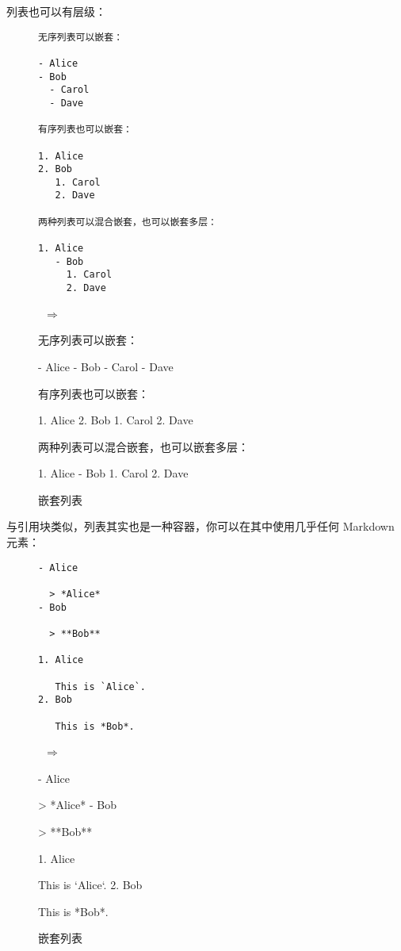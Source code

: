 \documentclass[a4paper,fontset=none]{ctexart}
\begin{document}
列表也可以有层级：

\begin{figure}[H]
    \centering
    \begin{minipage}{0.45\textwidth}
        \begin{verbatim}
无序列表可以嵌套：

- Alice
- Bob
  - Carol
  - Dave

有序列表也可以嵌套：

1. Alice
2. Bob
   1. Carol
   2. Dave

两种列表可以混合嵌套，也可以嵌套多层：

1. Alice
   - Bob
     1. Carol
     2. Dave
        \end{verbatim}
    \end{minipage}
    \, $\Longrightarrow$ \,
    \begin{minipage}{0.45\textwidth}
\begin{markdown}
无序列表可以嵌套：

- Alice
- Bob
  - Carol
  - Dave

有序列表也可以嵌套：

1. Alice
2. Bob
   1. Carol
   2. Dave

两种列表可以混合嵌套，也可以嵌套多层：

1. Alice
   - Bob
     1. Carol
     2. Dave
\end{markdown}
    \end{minipage}
    \caption{嵌套列表}
\end{figure}

与引用块类似，列表其实也是一种容器，你可以在其中使用几乎任何 Markdown 元素：

\begin{figure}[H]
    \centering
    \begin{minipage}{0.45\textwidth}
        \begin{verbatim}
- Alice

  > *Alice*
- Bob

  > **Bob**

1. Alice

   This is `Alice`.
2. Bob

   This is *Bob*.
        \end{verbatim}
    \end{minipage}
    \, $\Longrightarrow$ \,
    \begin{minipage}{0.45\textwidth}
\begin{markdown}
- Alice

  > *Alice*
- Bob

  > **Bob**

1. Alice

   This is `Alice`.
2. Bob

   This is *Bob*.
\end{markdown}
    \end{minipage}
    \caption{嵌套列表}
\end{figure}
\end{document}
